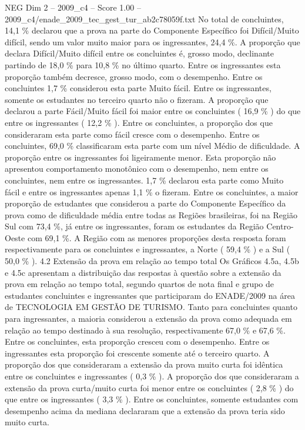 \begin{textsample}{NEG Dim 2 – 2009\_c4 – Score 1.00 – 2009\_c4/enade\_2009\_tec\_gest\_tur\_ab2c78059f.txt}
No total de concluintes, 14,1 \% declarou que a prova na parte do Componente Específico foi Difícil/Muito difícil, sendo um valor muito maior para os ingressantes, 24,4 \%.
A proporção que declara Difícil/Muito difícil entre os concluintes é, grosso modo, declinante partindo de 18,0 \% para 10,8 \% no último quarto.
Entre os ingressantes esta proporção também decresce, grosso modo, com o desempenho.
Entre os concluintes 1,7 \% considerou esta parte Muito fácil.
Entre os ingressantes, somente os estudantes no terceiro quarto não o fizeram.
A proporção que declarou a parte Fácil/Muito fácil foi maior entre os concluintes ( 16,9 \% ) do que entre os ingressantes ( 12,2 \% ).
Entre os concluintes, a proporção dos que consideraram esta parte como fácil cresce com o desempenho.
Entre os concluintes, 69,0 \% classificaram esta parte com um nível Médio de dificuldade.
A proporção entre os ingressantes foi ligeiramente menor.
Esta proporção não apresentou comportamento monotônico com o desempenho, nem entre os concluintes, nem entre os ingressantes. 1,7 \% declarou esta parte como Muito fácil e entre os ingressantes apenas 1,1 \% o fizeram.
Entre os concluintes, a maior proporção de estudantes que considerou a parte do Componente Específico da prova como de dificuldade média entre todas as Regiões brasileiras, foi na Região Sul com 73,4 \%, já entre os ingressantes, foram os estudantes da Região Centro-Oeste com 69,1 \%.
A Região com as menores proporções desta resposta foram respectivamente para os concluintes e ingressantes, a Norte ( 59,4 \% ) e a Sul ( 50,0 \% ). 4.2 Extensão da prova em relação ao tempo total Os Gráficos 4.5a, 4.5b e 4.5c apresentam a distribuição das respostas à questão sobre a extensão da prova em relação ao tempo total, segundo quartos de nota final e grupo de estudantes concluintes e ingressantes que participaram do ENADE/2009 na área de TECNOLOGIA EM GESTÃO DE TURISMO.
Tanto para concluintes quanto para ingressantes, a maioria considerou a extensão da prova como adequada em relação ao tempo destinado à sua resolução, respectivamente 67,0 \% e 67,6 \%.
Entre os concluintes, esta proporção cresceu com o desempenho.
Entre os ingressantes esta proporção foi crescente somente até o terceiro quarto.
A proporção dos que consideraram a extensão da prova muito curta foi idêntica entre os concluintes e ingressantes ( 0,3 \% ).
A proporção dos que consideraram a extensão da prova curta/muito curta foi menor entre os concluintes ( 2,8 \% ) do que entre os ingressantes ( 3,3 \% ).
Entre os concluintes, somente estudantes com desempenho acima da mediana declararam que a extensão da prova teria sido muito curta.

\end{textsample}
